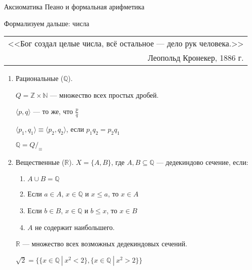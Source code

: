 \documentclass[aspectratio=169]{beamer}
\begin{document}
\begin{frame}
\begin{center}{\LARGE Аксиоматика Пеано и формальная арифметика}\end{center}

\end{frame}


\begin{frame}{Формализуем дальше: числа}

{\itshape \hfill \begin{tabular}{r} <<Бог создал целые числа, всё остальное — дело рук человека.>>\\
                                 Леопольд Кронекер, 1886 г.\end{tabular}}\pause
\begin{enumerate}
\item Рациональные ($\mathbb{Q}$).\pause

      $Q = \mathbb{Z} \times \mathbb{N}$ --- множество всех простых дробей.\pause

      $\langle p,q \rangle$ --- то же, что $\frac{p}{q}$ \pause

      $\langle p_1,q_1 \rangle \equiv \langle p_2, q_2 \rangle$, если $p_1q_2 = p_2q_1$\pause

\vspace{0.1cm}
      $\mathbb{Q} = Q/_\equiv$

\item Вещественные ($\mathbb{R}$). \pause $X = \{ A, B \}$, где $A,B \subseteq \mathbb{Q}$ --- дедекиндово сечение, если:\pause
\begin{enumerate}
\item $A\cup B = \mathbb{Q}$\pause
\item Если $a \in A$, $x \in \mathbb{Q}$ и $x \le a$, то $x \in A$\pause
\item Если $b \in B$, $x \in \mathbb{Q}$ и $b \le x$, то $x \in B$\pause
\item $A$ не содержит наибольшего.\pause
\end{enumerate}

       $\mathbb{R}$ --- множество всех возможных дедекиндовых сечений. \pause

$\sqrt 2 = \{\{ x\in\mathbb{Q}\ |\ x^2 < 2 \}, \{ x\in\mathbb{Q}\ |\ x^2 > 2\}\}$
\end{enumerate}
\end{frame}
\end{document}
